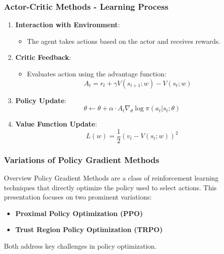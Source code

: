 \documentclass[aspectratio=169]{beamer}
\begin{document}
\begin{frame}[fragile]
    \frametitle{Actor-Critic Methods - Learning Process}
    \begin{enumerate}
        \item \textbf{Interaction with Environment}:
            \begin{itemize}
                \item The agent takes actions based on the actor and receives rewards.
            \end{itemize}
        
        \item \textbf{Critic Feedback}:
            \begin{itemize}
                \item Evaluates action using the advantage function:
                \begin{equation}
                A_t = r_t + \gamma V(s_{t+1}; w) - V(s_t; w)
                \end{equation}
            \end{itemize}
        
        \item \textbf{Policy Update}:
            \begin{equation}
            \theta \leftarrow \theta + \alpha \cdot A_t \nabla_{\theta} \log \pi(a_t | s_t; \theta)
            \end{equation}
        
        \item \textbf{Value Function Update}:
            \begin{equation}
            L(w) = \frac{1}{2}(v_t - V(s_t; w))^2
            \end{equation}
        \end{enumerate}
\end{frame}

\begin{frame}[fragile]
    \frametitle{Variations of Policy Gradient Methods}
    \begin{block}{Overview}
        Policy Gradient Methods are a class of reinforcement learning techniques that directly optimize the policy used to select actions. This presentation focuses on two prominent variations: 
        \begin{itemize}
            \item \textbf{Proximal Policy Optimization (PPO)}
            \item \textbf{Trust Region Policy Optimization (TRPO)}
        \end{itemize}
        Both address key challenges in policy optimization.
    \end{block}
\end{frame}
\end{document}
